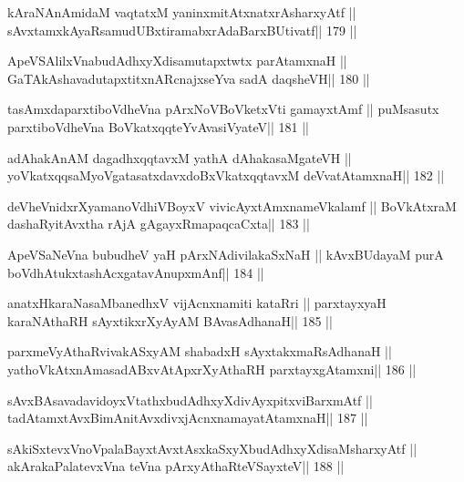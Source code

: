 \begin{shl}
kAraNAnAmidaM vaqtatxM yaninxmitAtxnatxrAsharxyAtf ||
sAvxtamxkAyaRsamudUBxtiramabxrAdaBarxBUtivatf\hfill || 179 ||
\end{shl}

\begin{shl}
ApeVSAlilxVnabudAdhxyXdisamutapxtwtx parAtamxnaH ||
GaTAkAshavadutapxtitxnARcnajxseYva sadA daqsheVH\hfill || 180 ||
\end{shl}

\begin{shl}
tasAmxdaparxtiboVdheVna pArxNoV\s BoVketxVti gamayxtAmf ||
puMsasutx parxtiboVdheVna BoVkatxqqteYvAvasiVyateV\hfill || 181 ||
\end{shl}

\begin{shl}
adAhakAnAM dagadhxqqtavxM yathA dAhakasaMgateVH ||
yoVkatxqqsaMyoVgatasatxdavxdoBxVkatxqqtavxM deVvatAtamxnaH\hfill || 182 ||
\end{shl}

\begin{shl}
deVheVnidxrXyamanoVdhiVBoyxV vivicAyx\s\s tAmxnameVkalamf ||
BoVkAtxraM dashaRyitAvx\s tha rAjA gAgayxRmapaqcaCxta\hfill || 183 ||
\end{shl}

\begin{shl}
ApeVSaNeVna bubudheV yaH pArxNAdivilakaSxNaH ||
kAvxBUdayaM purA boVdhAtukxtashAcx\s\s gatavAnupxmAnf\hfill || 184 ||
\end{shl}

\begin{shl}
anatxHkaraNasaMbanedhxV vijAcnxnamiti kataRri ||
parxtayxyaH karaNAthaRH sAyxtikxrXyAyAM BAvasAdhanaH\hfill || 185 ||
\end{shl}

\begin{shl}
parxmeVyAthaRvivakASxyAM shabadxH sAyxtakxmaRsAdhanaH ||
yathoVkAtxnAmasadABxvAtApxrXyAthaRH parxtayxgAtamxni\hfill || 186 ||
\end{shl}

\begin{shl}
sAvxBAsavadavidoyxVtathxbudAdhxyXdivAyxpitxviBarxmAtf ||
tadAtamxtAvxBimAnitAvxdivxjAcnxnamayatA\s\s tamxnaH\hfill || 187 ||
\end{shl}

\begin{shl}
sAkiSxtevxVnoVpalaBayxtAvxtAsxkaSxyXbudAdhxyXdisaMsharxyAtf ||
akArakaPalatevxVna teVna pArxyAthaRteVSayxteV\hfill || 188 ||
\end{shl}

